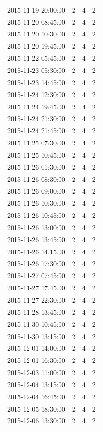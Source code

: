 \begin{tabular}{lrrr}
2015-11-19 20:00:00 & 2 & 4 & 2 \\
2015-11-20 08:45:00 & 2 & 4 & 2 \\
2015-11-20 10:30:00 & 2 & 4 & 2 \\
2015-11-20 19:45:00 & 2 & 4 & 2 \\
2015-11-22 05:45:00 & 2 & 4 & 2 \\
2015-11-23 05:30:00 & 2 & 4 & 2 \\
2015-11-23 14:45:00 & 2 & 4 & 2 \\
2015-11-24 12:30:00 & 2 & 4 & 2 \\
2015-11-24 19:45:00 & 2 & 4 & 2 \\
2015-11-24 21:30:00 & 2 & 4 & 2 \\
2015-11-24 21:45:00 & 2 & 4 & 2 \\
2015-11-25 07:30:00 & 2 & 4 & 2 \\
2015-11-25 10:45:00 & 2 & 4 & 2 \\
2015-11-26 01:30:00 & 2 & 4 & 2 \\
2015-11-26 08:30:00 & 2 & 4 & 2 \\
2015-11-26 09:00:00 & 2 & 4 & 2 \\
2015-11-26 10:30:00 & 2 & 4 & 2 \\
2015-11-26 10:45:00 & 2 & 4 & 2 \\
2015-11-26 13:00:00 & 2 & 4 & 2 \\
2015-11-26 13:45:00 & 2 & 4 & 2 \\
2015-11-26 14:15:00 & 2 & 4 & 2 \\
2015-11-26 17:30:00 & 2 & 4 & 2 \\
2015-11-27 07:45:00 & 2 & 4 & 2 \\
2015-11-27 17:45:00 & 2 & 4 & 2 \\
2015-11-27 22:30:00 & 2 & 4 & 2 \\
2015-11-28 13:45:00 & 2 & 4 & 2 \\
2015-11-30 10:45:00 & 2 & 4 & 2 \\
2015-11-30 13:15:00 & 2 & 4 & 2 \\
2015-12-01 14:00:00 & 2 & 4 & 2 \\
2015-12-01 16:30:00 & 2 & 4 & 2 \\
2015-12-03 11:00:00 & 2 & 4 & 2 \\
2015-12-04 13:15:00 & 2 & 4 & 2 \\
2015-12-04 16:45:00 & 2 & 4 & 2 \\
2015-12-05 18:30:00 & 2 & 4 & 2 \\
2015-12-06 13:30:00 & 2 & 4 & 2 \\

\end{tabular}
